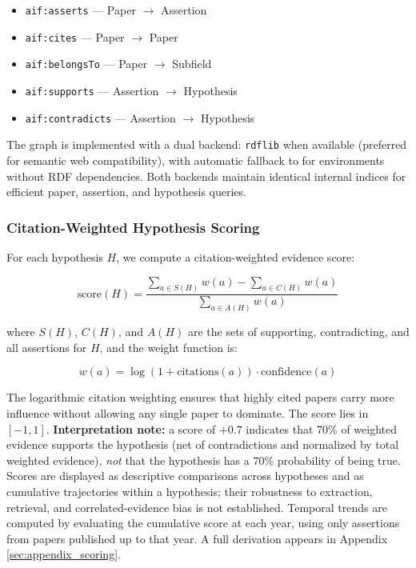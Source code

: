 \documentclass[
  english,
]{article}
\providecommand{\tightlist}{%
  \setlength{\itemsep}{0pt}\setlength{\parskip}{0pt}}
\begin{document}
\begin{itemize}
\tightlist
\item
  \texttt{aif:asserts} --- Paper \(\to\) Assertion
\item
  \texttt{aif:cites} --- Paper \(\to\) Paper
\item
  \texttt{aif:belongsTo} --- Paper \(\to\) Subfield
\item
  \texttt{aif:supports} --- Assertion \(\to\) Hypothesis
\item
  \texttt{aif:contradicts} --- Assertion \(\to\) Hypothesis
\end{itemize}

The graph is implemented with a dual backend: \texttt{rdflib}
\citep{rdflib2023} when available (preferred for semantic web
compatibility), with automatic fallback to  for
environments without RDF dependencies. Both backends maintain identical
internal indices for efficient paper, assertion, and hypothesis queries.

\subsubsection{Citation-Weighted Hypothesis
Scoring}\label{citation-weighted-hypothesis-scoring}

For each hypothesis \(H\), we compute a citation-weighted evidence
score:

\begin{equation}
\text{score}(H) = \frac{\sum_{a \in S(H)} w(a) - \sum_{a \in C(H)} w(a)}{\sum_{a \in A(H)} w(a)} \label{eq:score}
\end{equation}

where \(S(H)\), \(C(H)\), and \(A(H)\) are the sets of supporting,
contradicting, and all assertions for \(H\), and the weight function is:

\begin{equation}
w(a) = \log(1 + \text{citations}(a)) \cdot \text{confidence}(a) \label{eq:weight}
\end{equation}

The logarithmic citation weighting ensures that highly cited papers
carry more influence without allowing any single paper to dominate. The
score lies in \([-1, 1]\). \textbf{Interpretation note:} a score of
\(+0.7\) indicates that 70\% of weighted evidence supports the
hypothesis (net of contradictions and normalized by total weighted
evidence), \emph{not} that the hypothesis has a 70\% probability of
being true. Scores are displayed as descriptive comparisons across
hypotheses and as cumulative trajectories within a hypothesis; their
robustness to extraction, retrieval, and correlated-evidence bias is not
established. Temporal trends are computed by evaluating the cumulative
score at each year, using only assertions from papers published up to
that year. A full derivation appears in Appendix
\ref{sec:appendix_scoring}.
\end{document}
